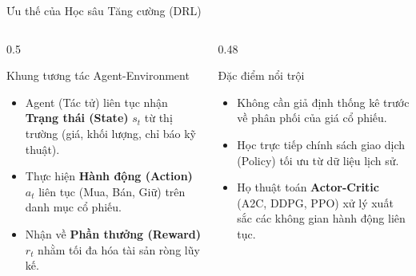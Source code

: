 \documentclass[10pt,aspectratio=169]{beamer}
\begin{document}
\begin{frame}{Ưu thế của Học sâu Tăng cường (DRL)}
  \begin{columns}
    \begin{column}{0.5\textwidth}
      \begin{block}{Khung tương tác Agent-Environment}
        \begin{itemize}
          \item Agent (Tác tử) liên tục nhận \textbf{Trạng thái (State)} $s_t$ từ thị trường (giá, khối lượng, chỉ báo kỹ thuật).
          \item Thực hiện \textbf{Hành động (Action)} $a_t$ liên tục (Mua, Bán, Giữ) trên danh mục cổ phiếu.
          \item Nhận về \textbf{Phần thưởng (Reward)} $r_t$ nhằm tối đa hóa tài sản ròng lũy kế.
        \end{itemize}
      \end{block}
    \end{column}
    
    \begin{column}{0.48\textwidth}
      \begin{exampleblock}{Đặc điểm nổi trội}
        \begin{itemize}
          \item Không cần giả định thống kê trước về phân phối của giá cổ phiếu.
          \item Học trực tiếp chính sách giao dịch (Policy) tối ưu từ dữ liệu lịch sử.
          \item Họ thuật toán \textbf{Actor-Critic} (A2C, DDPG, PPO) xử lý xuất sắc các không gian hành động liên tục.
        \end{itemize}
      \end{exampleblock}
    \end{column}
  \end{columns}
\end{frame}
\end{document}
